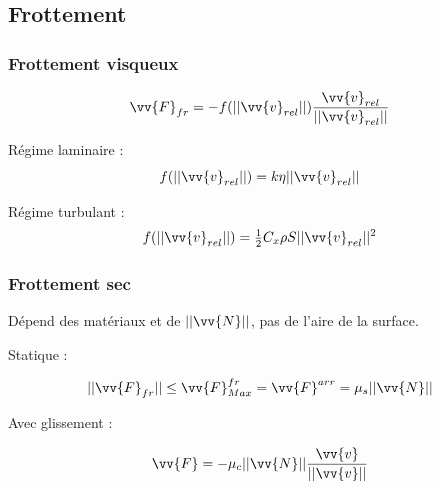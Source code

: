 \documentclass[landscape,a4paper]{article}
\newcommand{\F}{\ensuremath{\vv{F}}}
\newcommand{\vi}{\ensuremath{\vv{v}}}
\newcommand{\ur}{\ensuremath{\vv{u}_{r}}}
\begin{document}
\begin{multicols}{4}
\begin{center}
  \end{center}
  \subsection{Frottement}


  \subsubsection{Frottement visqueux}
  \[
    \F_{fr} = -f(||\vi_{rel}||)\frac{\vi_{rel}}{||\vi_{rel}||}
  \]

  Régime laminaire : 
  \[
    f(||\vi_{rel}||)=k\eta||\vi_{rel}||
  \]

  Régime turbulant :
  \[
    f(||\vi_{rel}||) = \tfrac{1}{2}C_x\rho S||\vi_{rel}||^2
  \]

  \subsubsection{Frottement sec}
  Dépend des matériaux et de \(||\vv{N}||\), pas de l'aire de la surface. 

  Statique :

  \[
    ||\F_{fr}|| \leq \F_{Max}^{fr} = \F^{arr}= \mu_s||\vv{N}||
  \]

  Avec glissement :

  \[
    \F=-\mu_c||\vv{N}||\frac{\vi}{||\vi||}
  \]


\end{multicols}
\end{document}
